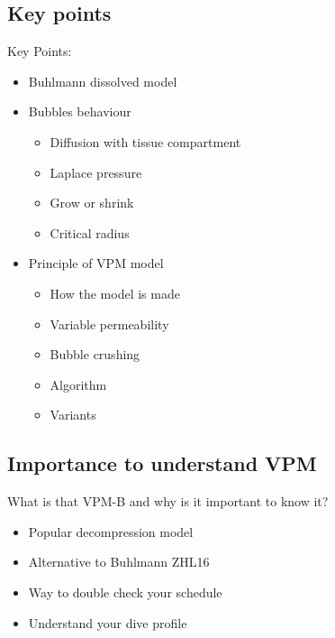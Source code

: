 \documentclass[aspectratio=1610,english,14pt]{beamer}
\begin{document}
\subsection{Key points}
\begin{frame}{\insertsubsection}
	Key Points:
	\begin{itemize}
		\item Buhlmann dissolved model
		\item Bubbles behaviour
		\begin{itemize}
			\item Diffusion with tissue compartment
			\item Laplace pressure
			\item Grow or shrink
			\item Critical radius
		\end{itemize}
		\item Principle of VPM model
		\begin{itemize}
			\item How the model is made
			\item Variable permeability
			\item Bubble crushing
			\item Algorithm
			\item Variants
		\end{itemize}
	\end{itemize}
\end{frame}

\subsection{Importance to understand VPM}
\begin{frame}{\insertsubsection}
	What is that VPM-B and why is it important to know it?
	\begin{itemize}
		\item Popular decompression model
		\item Alternative to Buhlmann ZHL16
		\item Way to double check your schedule
		\item Understand your dive profile
	\end{itemize}
\end{frame}

\end{document}
